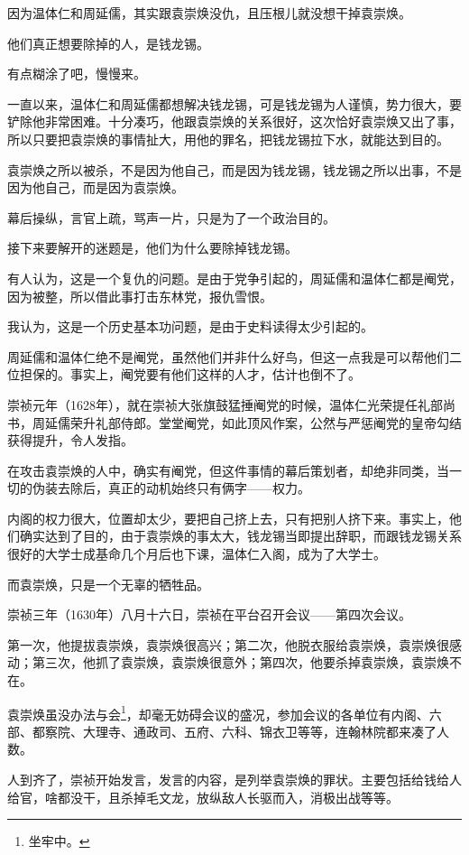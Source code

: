 \begin{multicols}{\theparacolNo}
		因为温体仁和周延儒，其实跟袁崇焕没仇，且压根儿就没想干掉袁崇焕。

		他们真正想要除掉的人，是钱龙锡。

		有点糊涂了吧，慢慢来。

		一直以来，温体仁和周延儒都想解决钱龙锡，可是钱龙锡为人谨慎，势力很大，要铲除他非常困难。十分凑巧，他跟袁崇焕的关系很好，这次恰好袁崇焕又出了事，所以只要把袁崇焕的事情扯大，用他的罪名，把钱龙锡拉下水，就能达到目的。

		袁崇焕之所以被杀，不是因为他自己，而是因为钱龙锡，钱龙锡之所以出事，不是因为他自己，而是因为袁崇焕。

		幕后操纵，言官上疏，骂声一片，只是为了一个政治目的。

		接下来要解开的迷题是，他们为什么要除掉钱龙锡。

		有人认为，这是一个复仇的问题。是由于党争引起的，周延儒和温体仁都是阉党，因为被整，所以借此事打击东林党，报仇雪恨。

		我认为，这是一个历史基本功问题，是由于史料读得太少引起的。

		周延儒和温体仁绝不是阉党，虽然他们并非什么好鸟，但这一点我是可以帮他们二位担保的。事实上，阉党要有他们这样的人才，估计也倒不了。

		崇祯元年（1628年），就在崇祯大张旗鼓猛捶阉党的时候，温体仁光荣提任礼部尚书，周延儒荣升礼部侍郎。堂堂阉党，如此顶风作案，公然与严惩阉党的皇帝勾结获得提升，令人发指。

		在攻击袁崇焕的人中，确实有阉党，但这件事情的幕后策划者，却绝非同类，当一切的伪装去除后，真正的动机始终只有俩字——权力。

		内阁的权力很大，位置却太少，要把自己挤上去，只有把别人挤下来。事实上，他们确实达到了目的，由于袁崇焕的事太大，钱龙锡当即提出辞职，而跟钱龙锡关系很好的大学士成基命几个月后也下课，温体仁入阁，成为了大学士。

		而袁崇焕，只是一个无辜的牺牲品。

		崇祯三年（1630年）八月十六日，崇祯在平台召开会议——第四次会议。

		第一次，他提拔袁崇焕，袁崇焕很高兴；第二次，他脱衣服给袁崇焕，袁崇焕很感动；第三次，他抓了袁崇焕，袁崇焕很意外；第四次，他要杀掉袁崇焕，袁崇焕不在。

		袁崇焕虽没办法与会\footnote{坐牢中。}，却毫无妨碍会议的盛况，参加会议的各单位有内阁、六部、都察院、大理寺、通政司、五府、六科、锦衣卫等等，连翰林院都来凑了人数。

		人到齐了，崇祯开始发言，发言的内容，是列举袁崇焕的罪状。主要包括给钱给人给官，啥都没干，且杀掉毛文龙，放纵敌人长驱而入，消极出战等等。


\end{multicols}
